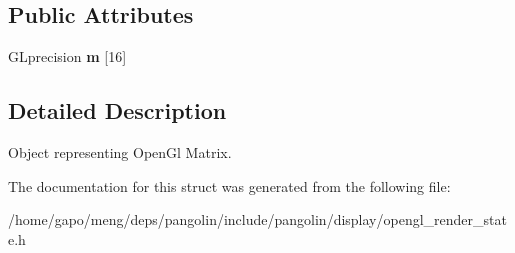 \subsection*{Public Attributes}
\begin{DoxyCompactItemize}
\item 
G\+Lprecision {\bfseries m} \mbox{[}16\mbox{]}\hypertarget{structpangolin_1_1_open_gl_matrix_a662660308aa8a3dfb2aee1abc143d56c}{}\label{structpangolin_1_1_open_gl_matrix_a662660308aa8a3dfb2aee1abc143d56c}

\end{DoxyCompactItemize}


\subsection{Detailed Description}
Object representing Open\+Gl Matrix. 

The documentation for this struct was generated from the following file\+:\begin{DoxyCompactItemize}
\item 
/home/gapo/meng/deps/pangolin/include/pangolin/display/opengl\+\_\+render\+\_\+state.\+h\end{DoxyCompactItemize}
